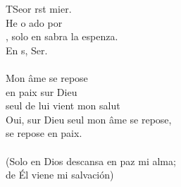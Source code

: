 \begin{cancion}%
	TSeor rst mier.\\
	He o ado por \\
	, solo en sabra la espenza. \\
	En s, Ser.\\
	\jump\\
Mon âme se repose\\
en paix sur Dieu \\
seul de lui vient mon salut\\
Oui, sur Dieu seul mon âme se repose,\\
se repose en paix.\\
	\jump\\
(Solo en Dios descansa en paz mi alma;\\
de Él viene mi salvación)\\
\end{cancion}%

